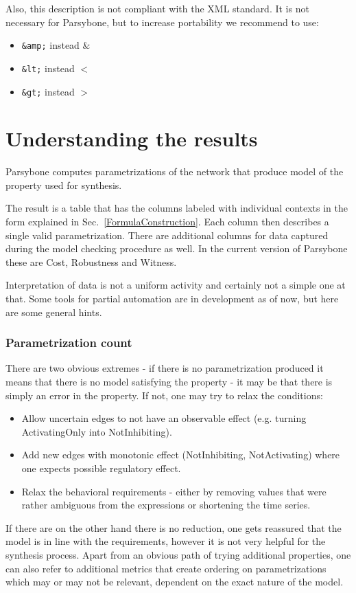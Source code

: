 \documentclass[12pt]{article}
\begin{document}
Also, this description is not compliant with the XML standard. It is not necessary for Parsybone, but to increase portability we recommend to use:
\begin{itemize}
\item \texttt{\&amp;} instead $\&$ 
\item \texttt{\&lt;} instead $<$ 
\item \texttt{\&gt;} instead $>$
\end{itemize}

\section{Understanding the results}
Parsybone computes parametrizations of the network that produce model of the property used for synthesis.

The result is a table that has the columns labeled with individual contexts in the form explained in Sec.~\ref{FormulaConstruction}. Each column then describes a single valid parametrization. There are additional columns for data captured during the model checking procedure as well. In the current version of Parsybone these are Cost, Robustness and Witness.

Interpretation of data is not a uniform activity and certainly not a simple one at that. Some tools for partial automation are in development as of now, but here are some general hints.

\subsubsection*{Parametrization count}
There are two obvious extremes - if there is no parametrization produced it means that there is no model satisfying the property - it may be that there is simply an error in the property. If not, one may try to relax the conditions:
\begin{itemize}
\item Allow uncertain edges to not have an observable effect (e.g. turning ActivatingOnly into NotInhibiting).
\item Add new edges with monotonic effect (NotInhibiting, NotActivating) where one expects possible regulatory effect.
\item Relax the behavioral requirements - either by removing values that were rather ambiguous from the expressions or shortening the time series.
\end{itemize}

If there are on the other hand there is no reduction, one gets reassured that the model is in line with the requirements, however it is not very helpful for the synthesis process. 
Apart from an obvious path of trying additional properties, one can also refer to additional metrics that create ordering on parametrizations which may or may not be relevant, dependent on the exact nature of the model.
\end{document}
